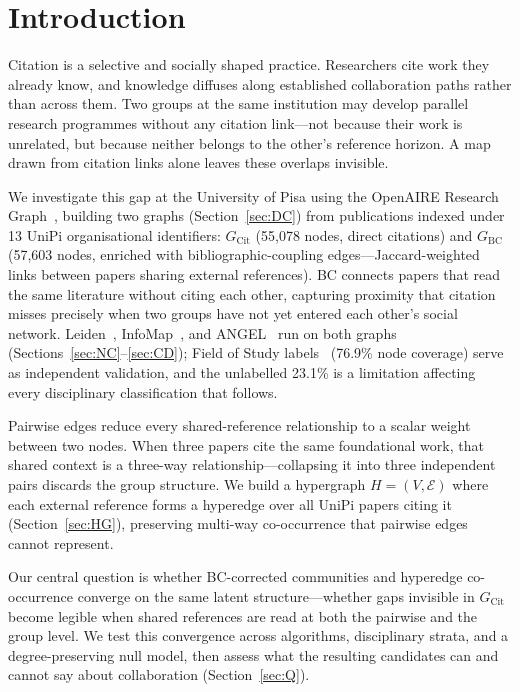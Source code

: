 \section{Introduction} \label{sec:I}

Citation is a selective and socially shaped practice. Researchers cite work they already know, and knowledge diffuses along established collaboration paths rather than across them. Two groups at the same institution may develop parallel research programmes without any citation link---not because their work is unrelated, but because neither belongs to the other's reference horizon. A map drawn from citation links alone leaves these overlaps invisible.

We investigate this gap at the University of Pisa using the OpenAIRE Research Graph~\cite{OpenAIRE_graph_9_0_1}, building two graphs (Section~\ref{sec:DC}) from publications indexed under 13 UniPi organisational identifiers: $G_{\mathrm{Cit}}$ (55,078 nodes, direct citations) and $G_{\mathrm{BC}}$ (57,603 nodes, enriched with bibliographic-coupling edges---Jaccard-weighted links between papers sharing external references). BC connects papers that read the same literature without citing each other, capturing proximity that citation misses precisely when two groups have not yet entered each other's social network. Leiden~\cite{traag2019louvain}, InfoMap~\cite{rosvall2008maps}, and ANGEL~\cite{rossetti2019exorcising} run on both graphs (Sections~\ref{sec:NC}--\ref{sec:CD}); Field of Study labels~\cite{SciNoBo2023} (76.9\% node coverage) serve as independent validation, and the unlabelled 23.1\% is a limitation affecting every disciplinary classification that follows.

Pairwise edges reduce every shared-reference relationship to a scalar weight between two nodes. When three papers cite the same foundational work, that shared context is a three-way relationship---collapsing it into three independent pairs discards the group structure. We build a hypergraph $H = (V, \mathcal{E})$ where each external reference forms a hyperedge over all UniPi papers citing it (Section~\ref{sec:HG}), preserving multi-way co-occurrence that pairwise edges cannot represent.

Our central question is whether BC-corrected communities and hyperedge co-occurrence converge on the same latent structure---whether gaps invisible in $G_{\mathrm{Cit}}$ become legible when shared references are read at both the pairwise and the group level. We test this convergence across algorithms, disciplinary strata, and a degree-preserving null model, then assess what the resulting candidates can and cannot say about collaboration (Section~\ref{sec:Q}).